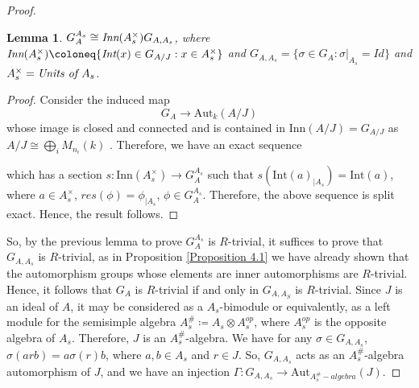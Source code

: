 \documentclass[12pt]{amsart}
\newtheorem{lemma}[theorem]{Lemma}
\theoremstyle{definition}
\numberwithin{equation}{section}
\begin{document}
\begin{proof}
\vskip4mm
\begin{lemma}\label{Lemma 4.23}
$G_{A}^{A_s}\cong \emph{Inn}(A_{s}^{\times})G_{A,A_s}$, where $\emph{Inn}(A_s^{\times})\coloneq\{\emph{Int}(x)\in G_{A/J} : x\in A_{s}^{\times}\}$ and $G_{A,A_s}=\{\sigma\in G_A: \sigma|_{A_s}=Id\}$ and $A_s^{\times}=\emph{Units of }A_{s}$.
\end{lemma}
\vskip1mm
\begin{proof}
Consider the induced map 
\begin{equation*}\label{eq11}
G_A\rightarrow \text{Aut}_k(A/J)
\end{equation*}
whose image is closed and connected and is contained in $\text{Inn}(A/J)=G_{A/J}$ as $A/J\cong \bigoplus_i M_{n_i}(k)$ . Therefore, we have an exact sequence 
\begin{center}
\end{center}
\vskip1mm
\noindent
which has a section $s:\text{Inn}(A_s^{\times})\rightarrow G_{A}^{A_s}$ such that $s(\text{Int}(a)_{|A_s})=\text{Int}(a)$, where $a\in A_s^{\times}$, $res(\phi)=\phi_{|A_s}$, $\phi\in G_{A}^{A_s}$. Therefore, the above sequence is split exact. Hence, the result follows.
\end{proof}

\vskip2mm  
\noindent
So, by the previous lemma to prove $G_{A}^{A_s}$ is $R$-trivial, it suffices to prove that $G_{A, A_s}$ is $R$-trivial, as in Proposition \ref{Proposition 4.1} we have already shown that the automorphism groups whose elements are inner automorphisms are $R$-trivial. Hence, it follows that $G_A$ is $R$-trivial if and only in $G_{A, A_S}$ is $R$-trivial.
\vskip4mm
\noindent
Since $J$ is an ideal of $A$, it may be considered as a $A_s$-bimodule or equivalently, as a left module for the semisimple algebra $A_{s}^{\#}\coloneqq A_s\otimes A_{s}^{\text{}op}$, where $A_{s}^{\text{}op}$ is the opposite algebra of $A_s$. Therefore, $J$ is an $A_{s}^{\#}$-algebra. We have for any $\sigma\in G_{A,A_s}$, $\sigma(arb)=a\sigma(r)b$, where $a,b\in A_s$ and $r\in J$. So, $G_{A,A_s}$ acts as an $A_s^{\#}$-algebra automorphism of $J$, and we have an injection $\Gamma: G_{A,A_s}\longrightarrow \text{Aut}_{A_s^{\#}-\textit{algebra}}(J)$. 


\end{proof}
\end{document}
